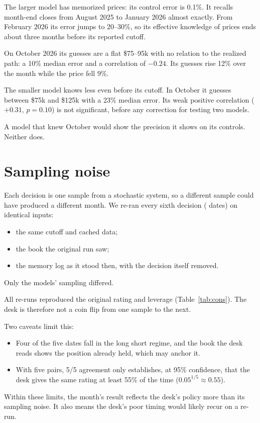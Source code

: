 The larger model has memorized prices: its control error is 0.1\%. It recalls month-end closes from August 2025 to January 2026 almost exactly. From February 2026 its error jumps to 20--30\%, so its effective knowledge of prices ends about three months before its reported cutoff.

On October 2026 its guesses are a flat \$75--95k with no relation to the realized path: a 10\% median error and a correlation of $-0.24$. Its guesses rise 12\% over the month while the price fell 9\%.

The smaller model knows less even before its cutoff. In October it guesses between \$75k and \$125k with a 23\% median error. Its weak positive correlation ($+0.31$, $p=0.10$) is not significant, before any correction for testing two models.

A model that knew October would show the precision it shows on its controls. Neither does.

\section{Sampling noise}\label{sec:consistency}

Each decision is one sample from a stochastic system, so a different sample could have produced a different month. We re-ran every sixth decision (\ConsN{} dates) on identical inputs:
\begin{itemize}
\item the same cutoff and cached data;
\item the book the original run saw;
\item the memory log as it stood then, with the decision itself removed.
\end{itemize}
Only the models' sampling differed.

\begin{table}[h]\centering\small
\caption{Original and re-run decisions on identical inputs.}\label{tab:cons}

\end{table}

All \ConsSame{} re-runs reproduced the original rating and leverage (Table~\ref{tab:cons}). The desk is therefore not a coin flip from one sample to the next.

Two caveats limit this:
\begin{itemize}
\item Four of the five dates fall in the long short regime, and the book the desk reads shows the position already held, which may anchor it.
\item With five pairs, 5/5 agreement only establishes, at 95\% confidence, that the desk gives the same rating at least 55\% of the time ($0.05^{1/5}\approx0.55$).
\end{itemize}
Within these limits, the month's result reflects the desk's policy more than its sampling noise. It also means the desk's poor timing would likely recur on a re-run.
